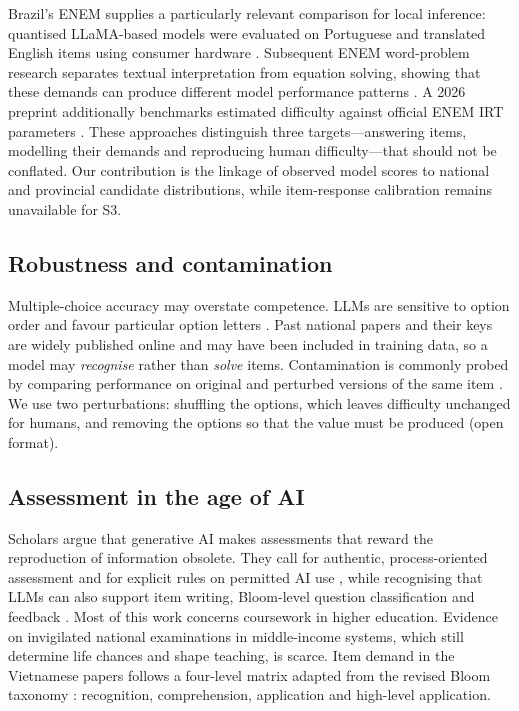 \documentclass[preprint,12pt,authoryear,nonatbib]{elsarticle}
\begin{document}
Brazil's ENEM supplies a particularly relevant comparison for local inference: quantised LLaMA-based models were evaluated on Portuguese and translated English items using consumer hardware \citep{santos2023enem}. Subsequent ENEM word-problem research separates textual interpretation from equation solving, showing that these demands can produce different model performance patterns \citep{calais2025}. A 2026 preprint additionally benchmarks estimated difficulty against official ENEM IRT parameters \citep{brant2026enem}. These approaches distinguish three targets---answering items, modelling their demands and reproducing human difficulty---that should not be conflated. Our contribution is the linkage of observed model scores to national and provincial candidate distributions, while item-response calibration remains unavailable for S3.

\subsection{Robustness and contamination}
Multiple-choice accuracy may overstate competence. LLMs are sensitive to option order and favour particular option letters \citep{pezeshkpour2024,zheng2024mcq}. Past national papers and their keys are widely published online and may have been included in training data, so a model may \emph{recognise} rather than \emph{solve} items. Contamination is commonly probed by comparing performance on original and perturbed versions of the same item \citep{golchin2025}. We use two perturbations: shuffling the options, which leaves difficulty unchanged for humans, and removing the options so that the value must be produced (open format).

\subsection{Assessment in the age of AI}
Scholars argue that generative AI makes assessments that reward the reproduction of information obsolete. They call for authentic, process-oriented assessment and for explicit rules on permitted AI use \citep{swiecki2022,perkins2024aias}, while recognising that LLMs can also support item writing, Bloom-level question classification and feedback \citep{kasneci2023,alfaraby2024}. Most of this work concerns coursework in higher education. Evidence on invigilated national examinations in middle-income systems, which still determine life chances and shape teaching, is scarce. Item demand in the Vietnamese papers follows a four-level matrix adapted from the revised Bloom taxonomy \citep{anderson2001}: recognition, comprehension, application and high-level application.
\end{document}
